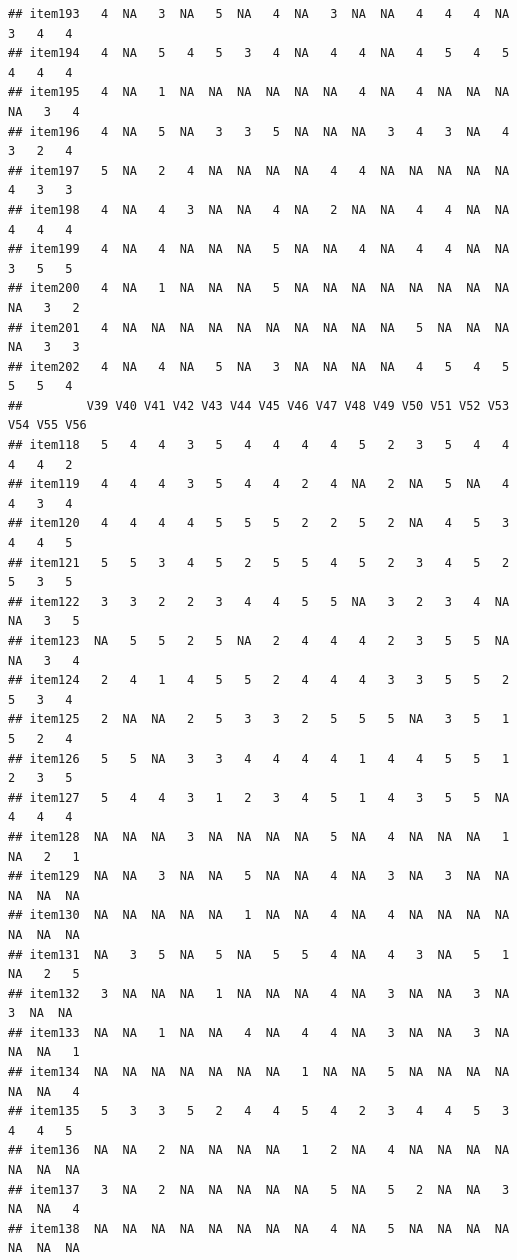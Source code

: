 \documentclass[
  man]{apa6}
\begin{document}
\begin{verbatim}
## item193   4  NA   3  NA   5  NA   4  NA   3  NA  NA   4   4   4  NA   3   4   4
## item194   4  NA   5   4   5   3   4  NA   4   4  NA   4   5   4   5   4   4   4
## item195   4  NA   1  NA  NA  NA  NA  NA  NA   4  NA   4  NA  NA  NA  NA   3   4
## item196   4  NA   5  NA   3   3   5  NA  NA  NA   3   4   3  NA   4   3   2   4
## item197   5  NA   2   4  NA  NA  NA  NA   4   4  NA  NA  NA  NA  NA   4   3   3
## item198   4  NA   4   3  NA  NA   4  NA   2  NA  NA   4   4  NA  NA   4   4   4
## item199   4  NA   4  NA  NA  NA   5  NA  NA   4  NA   4   4  NA  NA   3   5   5
## item200   4  NA   1  NA  NA  NA   5  NA  NA  NA  NA  NA  NA  NA  NA  NA   3   2
## item201   4  NA  NA  NA  NA  NA  NA  NA  NA  NA  NA   5  NA  NA  NA  NA   3   3
## item202   4  NA   4  NA   5  NA   3  NA  NA  NA  NA   4   5   4   5   5   5   4
##         V39 V40 V41 V42 V43 V44 V45 V46 V47 V48 V49 V50 V51 V52 V53 V54 V55 V56
## item118   5   4   4   3   5   4   4   4   4   5   2   3   5   4   4   4   4   2
## item119   4   4   4   3   5   4   4   2   4  NA   2  NA   5  NA   4   4   3   4
## item120   4   4   4   4   5   5   5   2   2   5   2  NA   4   5   3   4   4   5
## item121   5   5   3   4   5   2   5   5   4   5   2   3   4   5   2   5   3   5
## item122   3   3   2   2   3   4   4   5   5  NA   3   2   3   4  NA  NA   3   5
## item123  NA   5   5   2   5  NA   2   4   4   4   2   3   5   5  NA  NA   3   4
## item124   2   4   1   4   5   5   2   4   4   4   3   3   5   5   2   5   3   4
## item125   2  NA  NA   2   5   3   3   2   5   5   5  NA   3   5   1   5   2   4
## item126   5   5  NA   3   3   4   4   4   4   1   4   4   5   5   1   2   3   5
## item127   5   4   4   3   1   2   3   4   5   1   4   3   5   5  NA   4   4   4
## item128  NA  NA  NA   3  NA  NA  NA  NA   5  NA   4  NA  NA  NA   1  NA   2   1
## item129  NA  NA   3  NA  NA   5  NA  NA   4  NA   3  NA   3  NA  NA  NA  NA  NA
## item130  NA  NA  NA  NA  NA   1  NA  NA   4  NA   4  NA  NA  NA  NA  NA  NA  NA
## item131  NA   3   5  NA   5  NA   5   5   4  NA   4   3  NA   5   1  NA   2   5
## item132   3  NA  NA  NA   1  NA  NA  NA   4  NA   3  NA  NA   3  NA   3  NA  NA
## item133  NA  NA   1  NA  NA   4  NA   4   4  NA   3  NA  NA   3  NA  NA  NA   1
## item134  NA  NA  NA  NA  NA  NA  NA   1  NA  NA   5  NA  NA  NA  NA  NA  NA   4
## item135   5   3   3   5   2   4   4   5   4   2   3   4   4   5   3   4   4   5
## item136  NA  NA   2  NA  NA  NA  NA   1   2  NA   4  NA  NA  NA  NA  NA  NA  NA
## item137   3  NA   2  NA  NA  NA  NA  NA   5  NA   5   2  NA  NA   3  NA  NA   4
## item138  NA  NA  NA  NA  NA  NA  NA  NA   4  NA   5  NA  NA  NA  NA  NA  NA  NA

\end{verbatim}
\end{document}
